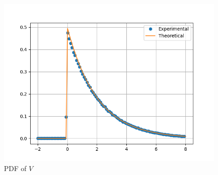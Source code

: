 \documentclass[journal, 12pt, twocolumn]{IEEEtran}
\begin{document}
\begin{enumerate}[label=\arabic{section}.\arabic*]
\begin{figure}[!ht]
            \includegraphics[width=\columnwidth]{figs/pdf_chi.png}
            \caption{PDF of $V$}
            \label{fig:pdf_chi}
        \end{figure}


\end{enumerate}
\end{document}
